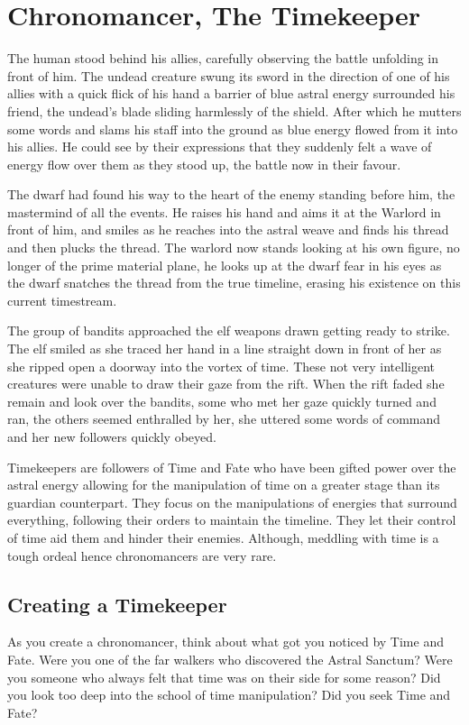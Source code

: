 \section{Chronomancer, The Timekeeper}

The human stood behind his allies, carefully observing the battle unfolding in front of him. The undead creature swung its sword in the direction of one of his allies with a quick flick of his hand a barrier of blue astral energy surrounded his friend, the undead's blade sliding harmlessly of the shield. After which he mutters some words and slams his staff into the ground as blue energy flowed from it into his allies. He could see by their expressions that they suddenly felt a wave of energy flow over them as they stood up, the battle now in their favour.

\newpage

The dwarf had found his way to the heart of the enemy standing before him, the mastermind of all the events. He raises his hand and aims it at the Warlord in front of him, and smiles as he reaches into the astral weave and finds his thread and then plucks the thread. The warlord now stands looking at his own figure, no longer of the prime material plane, he looks up at the dwarf fear in his eyes as the dwarf snatches the thread from the true timeline, erasing his existence on this current timestream.

The group of bandits approached the elf weapons drawn getting ready to strike. The elf smiled as she traced her hand in a line straight down in front of her as she ripped open a doorway into the vortex of time. These not very intelligent creatures were unable to draw their gaze from the rift. When the rift faded she remain and look over the bandits, some who met her gaze quickly turned and ran, the others seemed enthralled by her, she uttered some words of command and her new followers quickly obeyed.

Timekeepers are followers of Time and Fate who have been gifted power over the astral energy allowing for the manipulation of time on a greater stage than its guardian counterpart. They focus on the manipulations of energies that surround everything, following their orders to maintain the timeline. They let their control of time aid them and hinder their enemies. Although, meddling with time is a tough ordeal hence chronomancers are very rare.

\subsection{Creating a Timekeeper}
As you create a chronomancer, think about what got you noticed by Time and Fate. Were you one of the far walkers who discovered the Astral Sanctum? Were you someone who always felt that time was on their side for some reason? Did you look too deep into the school of time manipulation? Did you seek Time and Fate?

